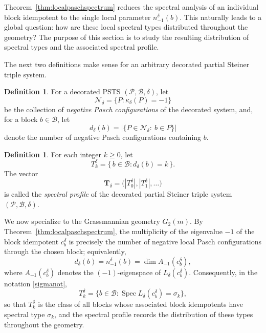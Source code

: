 \documentclass[times,11pt,reqno]{amsproc}
\theoremstyle{definition}
\newtheorem{definition}[theorem]{Definition}
\numberwithin{equation}{section}
\DeclareMathOperator{\Spec}{Spec}
\begin{document}
Theorem~\ref{thm:localpaschspectrum} reduces the spectral analysis of an individual block idempotent to the single local parameter $n_{-1}^{\delta}(b)$. This naturally leads to a global question: how are these local spectral types distributed throughout the geometry? The purpose of this section is to study the resulting distribution of spectral types and the associated spectral profile.

The next two definitions make sense for an arbitrary decorated
partial Steiner triple system.

\begin{definition}
For a decorated PSTS $(\mathcal P,\mathcal B,\delta)$, let
\begin{equation}\label{Ndelta}
\mathcal N_\delta
=
\{
P:\kappa_\delta(P)=-1
\}
\end{equation}
be the collection of \emph{negative Pasch configurations} of the
decorated system, and, for a block $b\in\mathcal B$, let
\begin{equation}\label{degreegeneral}
d_\delta(b)
=
|\{P\in\mathcal N_\delta:\ b\in P\}|
\end{equation}
denote the number of negative Pasch configurations containing $b$.
\end{definition}

\begin{definition}
For each integer \(k\ge 0\), let
\begin{equation}\label{Tdelta}
T_k^\delta
=
\{\,b\in\mathcal B:d_\delta(b)=k\,\}.
\end{equation}
The vector
\begin{equation}\label{Tdelta1}
\mathbf T_\delta
=
\bigl(|T_0^\delta|,|T_1^\delta|,\dots\bigr)
\end{equation}
is called the \emph{spectral profile} of the decorated partial Steiner
triple system \((\mathcal P,\mathcal B,\delta)\).
\end{definition}

We now specialize to the Grassmannian geometry $G_2(m)$.
By
Theorem~\ref{thm:localpaschspectrum}, the multiplicity of the eigenvalue
$-1$ of the block idempotent $c_b^\delta$ is precisely the number of
negative local Pasch configurations through the chosen block;
equivalently,
\begin{equation}\label{neqd}
d_\delta(b)
=
n_{-1}^{\delta}(b)
=
\dim A_{-1}(c_b^\delta),
\end{equation}
where $A_{-1}(c_b^\delta)$ denotes the $(-1)$-eigenspace of
$L_{\delta}(c_b^\delta)$. Consequently, in the notation \eqref{sigmanot},
$$
T_k^\delta
=
\{
b\in\mathcal B:
\Spec L_\delta(c_b^\delta)=\sigma_k
\},
$$
so that $T_k^\delta$ is the class of all blocks whose associated block
idempotents have spectral type $\sigma_k$, and the spectral profile
records the distribution of these types throughout the geometry.
\end{document}
